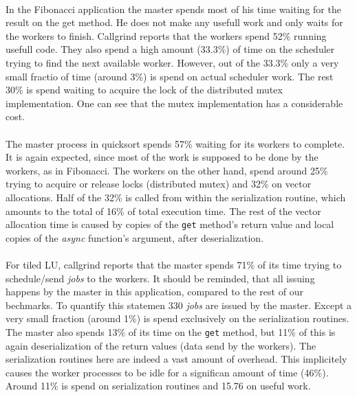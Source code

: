 \paragraph{}
In the Fibonacci application the master spends most of his time waiting for the result on the 
get method.  He does not make any usefull work and only waits for the workers to finish.  Callgrind reports that the
workers spend 52\% running usefull code.  They also spend a high amount (33.3\%) of time on the scheduler trying to 
find the next available worker.  However, out of the 33.3\% only a very small fractio of time (around 3\%) is spend
on actual scheduler work.  The rest 30\% is spend waiting to acquire the lock of the distributed mutex implementation.
One can see that the mutex implementation has a considerable cost.   

\paragraph{}
The master process in quicksort spends 57\% waiting for its workers to complete.  It is again expected, since
most of the work is supposed to be done by the workers, as in Fibonacci.   The workers on the other hand, spend
around 25\% trying to acquire or release locks (distributed mutex) and 32\% on vector allocations.  Half of the
32\% is called from within the serialization routine, which amounts to the total of 16\% of total execution time.
The rest of the vector allocation time is caused by copies of the \texttt{get} method's return value and local
copies of the \emph{async} function's argument, after deserialization.

\paragraph{}
For tiled LU, callgrind reports that the master spends 71\% of its time trying to schedule/send \emph{jobs} to the
workers.  It should be reminded, that all issuing happens by the master in this application, compared to the rest
of our bechmarks.  To quantify this statemen 330 \emph{jobs} are issued by the master.  Except a very small fraction
(around 1\%) is spend exclusively on the serialization routines.  The master also spends 13\% of its time on the 
\texttt{get} method, but 11\% of this is again deserialization of the return values (data send by the workers).  The
serialization routines here are indeed a vast amount of overhead.  This implicitely causes the worker processes to
be idle for a significan amount of time (46\%).  Around 11\% is spend on serialization routines and 15.76 on useful
work.

